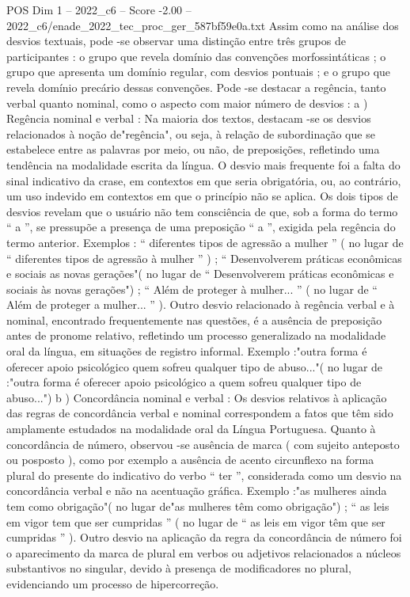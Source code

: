 \begin{textsample}{POS Dim 1 – 2022\_c6 – Score -2.00 – 2022\_c6/enade\_2022\_tec\_proc\_ger\_587bf59e0a.txt}
Assim como na análise dos desvios textuais, pode -se observar uma distinção entre três grupos de participantes : o grupo que revela domínio das convenções morfossintáticas ; o grupo que apresenta um domínio regular, com desvios pontuais ; e o grupo que revela domínio precário dessas convenções.
Pode -se destacar a regência, tanto verbal quanto nominal, como o aspecto com maior número de desvios : a ) Regência nominal e verbal : Na maioria dos textos, destacam -se os desvios relacionados à noção de"regência", ou seja, à relação de subordinação que se estabelece entre as palavras por meio, ou não, de preposições, refletindo uma tendência na modalidade escrita da língua.
O desvio mais frequente foi a falta do sinal indicativo da crase, em contextos em que seria obrigatória, ou, ao contrário, um uso indevido em contextos em que o princípio não se aplica.
Os dois tipos de desvios revelam que o usuário não tem consciência de que, sob a forma do termo “ a ”, se pressupõe a presença de uma preposição “ a ”, exigida pela regência do termo anterior.
Exemplos : “ diferentes tipos de agressão a mulher ” ( no lugar de “ diferentes tipos de agressão à mulher ” ) ; “ Desenvolverem práticas econômicas e sociais as novas gerações"( no lugar de “ Desenvolverem práticas econômicas e sociais às novas gerações") ; “ Além de proteger à mulher... ” ( no lugar de “ Além de proteger a mulher... ” ).
Outro desvio relacionado à regência verbal e à nominal, encontrado frequentemente nas questões, é a ausência de preposição antes de pronome relativo, refletindo um processo generalizado na modalidade oral da língua, em situações de registro informal.
Exemplo :"outra forma é oferecer apoio psicológico quem sofreu qualquer tipo de abuso..."( no lugar de :"outra forma é oferecer apoio psicológico a quem sofreu qualquer tipo de abuso...") b ) Concordância nominal e verbal : Os desvios relativos à aplicação das regras de concordância verbal e nominal correspondem a fatos que têm sido amplamente estudados na modalidade oral da Língua Portuguesa.
Quanto à concordância de número, observou -se ausência de marca ( com sujeito anteposto ou posposto ), como por exemplo a ausência de acento circunflexo na forma plural do presente do indicativo do verbo “ ter ”, considerada como um desvio na concordância verbal e não na acentuação gráfica.
Exemplo :"as mulheres ainda tem como obrigação"( no lugar de"as mulheres têm como obrigação") ; “ as leis em vigor tem que ser cumpridas ” ( no lugar de “ as leis em vigor têm que ser cumpridas ” ).
Outro desvio na aplicação da regra da concordância de número foi o aparecimento da marca de plural em verbos ou adjetivos relacionados a núcleos substantivos no singular, devido à presença de modificadores no plural, evidenciando um processo de hipercorreção.

\end{textsample}
